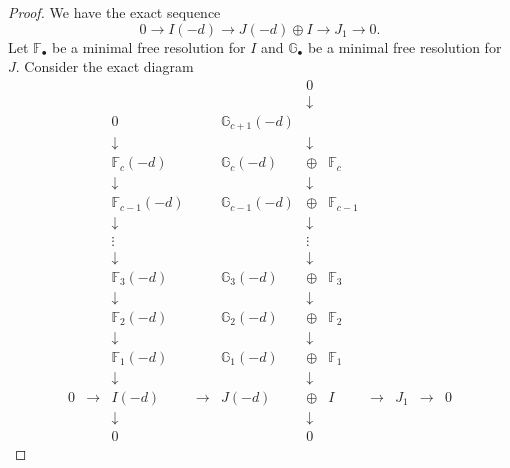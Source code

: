 \documentclass[12pt,twoside]{amsart}
\numberwithin{equation}{section}
\theoremstyle{definition}
\begin{document}
\begin{proof}
We have the exact
sequence
\begin{equation} \label{short exact}
0 \rightarrow I(-d) \rightarrow J(-d) \oplus I \rightarrow J_1
\rightarrow 0.
\end{equation}
Let $\mathbb F_\bullet$ be a minimal free resolution for $I$ and
$\mathbb G_\bullet$ be a minimal free resolution for $J$. Consider the exact diagram
\begin{equation} \label{big diagram}
\begin{array}{ccccrclccccccccccccccccccccccc}
&&&&&0 \\
&&&&& \downarrow \\
&& 0 && {\mathbb G}_{c+1}(-d) \\
&& \downarrow &&& \downarrow \\
&& {\mathbb F}_c(-d) && {\mathbb G}_c(-d) & \oplus & {\mathbb F}_c \\
&& \downarrow &&& \downarrow \\
&& {\mathbb F}_{c-1}(-d) && {\mathbb G}_{c-1}(-d) & \oplus & {\mathbb F}_{c-1} \\
&& \downarrow &&& \downarrow \\
&& \vdots &&& \vdots \\
&& \downarrow &&& \downarrow \\
&&{\mathbb F}_3(-d) && {\mathbb G}_3(-d) & \oplus & {\mathbb F}_3 \\
&& \downarrow &&& \downarrow \\
&& {\mathbb F}_2(-d) && {\mathbb G}_2(-d) & \oplus & {\mathbb F}_2 \\
&& \downarrow &&& \downarrow \\
&& {\mathbb F}_1(-d) && {\mathbb G}_1(-d) & \oplus & {\mathbb F}_1 \\
&& \downarrow &&& \downarrow \\
0 & \rightarrow & I(-d) & \rightarrow & J(-d) & \oplus & I & \rightarrow & J_1 & \rightarrow & 0 \\
&& \downarrow &&& \downarrow \\
&& 0 &&& 0

\end{array}
\end{equation}


\end{proof}
\end{document}
